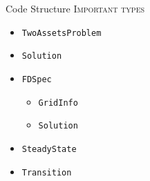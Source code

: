 \documentclass[10pt]{beamer} %
\theoremstyle{plain}
\theoremstyle{definition}
\theoremstyle{remark}
\begin{document}
\begin{frame}{Code Structure}{}  
\textsc{Important types}
   
\begin{itemize}
    \item \texttt{TwoAssetsProblem} \medskip

    \item \texttt{Solution} \medskip

    \item \texttt{FDSpec} \medskip
    \begin{itemize}
        \item \texttt{GridInfo}
        \item \texttt{Solution}
    \end{itemize} \medskip

    \item \texttt{SteadyState} \medskip

    \item \texttt{Transition}
\end{itemize}
\end{frame}
\end{document}
